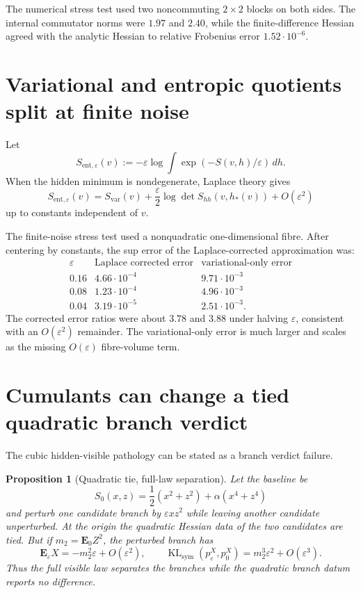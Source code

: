 \documentclass[11pt,a4paper]{article}
\numberwithin{equation}{section}
\DeclareMathOperator{\KL}{KL}
\newcommand{\E}{\mathbf E}
\theoremstyle{thmcompact}
\newtheorem{proposition}[theorem]{Proposition}
\theoremstyle{remark}
\begin{document}
The numerical stress test used two noncommuting $2\times2$ blocks on both sides. The internal commutator norms were $1.97$ and $2.40$, while the finite-difference Hessian agreed with the analytic Hessian to relative Frobenius error $1.52\cdot10^{-6}$.

\section{Variational and entropic quotients split at finite noise}

Let
\[
S_{\mathrm{ent},\varepsilon}(v)
:=-\varepsilon\log\int \exp(-S(v,h)/\varepsilon)\,dh.
\]
When the hidden minimum is nondegenerate, Laplace theory gives
\[
S_{\mathrm{ent},\varepsilon}(v)
=S_{\mathrm{var}}(v)
+\frac{\varepsilon}{2}\log\det S_{hh}(v,h_*(v))
+O(\varepsilon^2)
\]
up to constants independent of $v$.

The finite-noise stress test used a nonquadratic one-dimensional fibre. After centering by constants, the sup error of the Laplace-corrected approximation was:
\[
\begin{array}{c|c|c}
\varepsilon & \text{Laplace corrected error} & \text{variational-only error}\\
\hline
0.16 & 4.66\cdot10^{-4} & 9.71\cdot10^{-3}\\
0.08 & 1.23\cdot10^{-4} & 4.96\cdot10^{-3}\\
0.04 & 3.19\cdot10^{-5} & 2.51\cdot10^{-3}.
\end{array}
\]
The corrected error ratios were about $3.78$ and $3.88$ under halving $\varepsilon$, consistent with an $O(\varepsilon^2)$ remainder. The variational-only error is much larger and scales as the missing $O(\varepsilon)$ fibre-volume term.

\section{Cumulants can change a tied quadratic branch verdict}

The cubic hidden-visible pathology can be stated as a branch verdict failure.

\begin{proposition}[Quadratic tie, full-law separation]
\label{prop:cumulant-verdict}
Let the baseline be
\[
S_0(x,z)=\frac12(x^2+z^2)+\alpha(x^4+z^4)
\]
and perturb one candidate branch by $\varepsilon xz^2$ while leaving another candidate unperturbed. At the origin the quadratic Hessian data of the two candidates are tied. But if $m_2=\E_0Z^2$, the perturbed branch has
\[
\E_\varepsilon X=-m_2^2\varepsilon+O(\varepsilon^2),
\qquad
\KL_{\mathrm{sym}}(p_\varepsilon^X,p_0^X)
=m_2^3\varepsilon^2+O(\varepsilon^3).
\]
Thus the full visible law separates the branches while the quadratic branch datum reports no difference.
\end{proposition}
\end{document}
